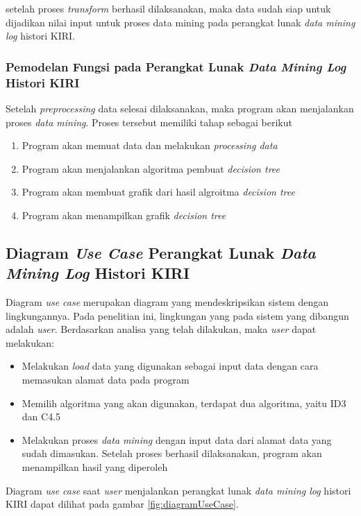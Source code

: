 setelah proses \textsl{transform} berhasil dilaksanakan, maka data sudah siap untuk dijadikan nilai input untuk proses data mining pada perangkat lunak \textsl{data mining log} histori KIRI.

\subsubsection{Pemodelan Fungsi pada Perangkat Lunak \textsl{Data Mining Log} Histori KIRI}
Setelah \textsl{preprocessing} data selesai dilaksanakan, maka program akan menjalankan proses \textsl{data mining}. Proses tersebut memiliki tahap sebagai berikut
\begin{enumerate}
	\item Program akan memuat data dan melakukan \textsl{processing data}
	\item Program akan menjalankan algoritma pembuat \textsl{decision tree} 
	\item Program akan membuat grafik dari hasil algroitma \textsl{decision tree}
	\item Program akan menampilkan grafik \textsl{decision tree}
\end{enumerate}  

\subsection{Diagram \textsl{Use Case} Perangkat Lunak \textsl{Data Mining Log} Histori KIRI}

Diagram \textsl{use case} merupakan diagram yang mendeskripsikan sistem dengan lingkungannya. Pada penelitian ini, lingkungan yang pada sistem yang dibangun adalah \textsl{user}. Berdasarkan analisa yang telah dilakukan, maka \textsl{user} dapat melakukan:
\begin{itemize}
	\item Melakukan \textsl{load} data yang digunakan sebagai input data dengan cara memasukan alamat data pada program
	\item Memilih algoritma yang akan digunakan, terdapat dua algoritma, yaitu ID3 dan C4.5
	\item Melakukan proses \textsl{data mining} dengan input data dari alamat data yang sudah dimasukan. Setelah proses berhasil dilaksanakan, program akan menampilkan hasil yang diperoleh
\end{itemize}

Diagram \textsl{use case} saat \textsl{user} menjalankan perangkat lunak \textsl{data mining log} histori KIRI dapat dilihat pada gambar \ref{fig:diagramUseCase}.

